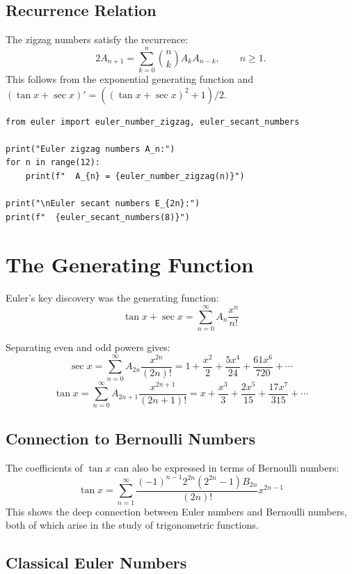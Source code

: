 \subsection{Recurrence Relation}

The zigzag numbers satisfy the recurrence:
\[
2A_{n+1} = \sum_{k=0}^{n} \binom{n}{k} A_k A_{n-k},\qquad n\geq 1.
\]
This follows from the exponential generating function and
$(\tan x+\sec x)'=((\tan x+\sec x)^2+1)/2$.

\begin{lstlisting}[caption={Computing Euler zigzag numbers}, label=lst:euler_zigzag]
from euler import euler_number_zigzag, euler_secant_numbers

print("Euler zigzag numbers A_n:")
for n in range(12):
    print(f"  A_{n} = {euler_number_zigzag(n)}")

print("\nEuler secant numbers E_{2n}:")
print(f"  {euler_secant_numbers(8)}")
\end{lstlisting}

\section{The Generating Function}

Euler's key discovery was the generating function:
\[
\tan x + \sec x = \sum_{n=0}^{\infty} A_n \frac{x^n}{n!}
\]

Separating even and odd powers gives:
\[
\sec x = \sum_{n=0}^{\infty} A_{2n} \frac{x^{2n}}{(2n)!} = 1 + \frac{x^2}{2} + \frac{5x^4}{24} + \frac{61x^6}{720} + \cdots
\]
\[
\tan x = \sum_{n=0}^{\infty} A_{2n+1} \frac{x^{2n+1}}{(2n+1)!} = x + \frac{x^3}{3} + \frac{2x^5}{15} + \frac{17x^7}{315} + \cdots
\]

\subsection{Connection to Bernoulli Numbers}

The coefficients of $\tan x$ can also be expressed in terms of Bernoulli numbers:
\[
\tan x = \sum_{n=1}^{\infty} \frac{(-1)^{n-1} 2^{2n}(2^{2n}-1) B_{2n}}{(2n)!} x^{2n-1}
\]
This shows the deep connection between Euler numbers and Bernoulli numbers, both of
which arise in the study of trigonometric functions.

\subsection{Classical Euler Numbers}

